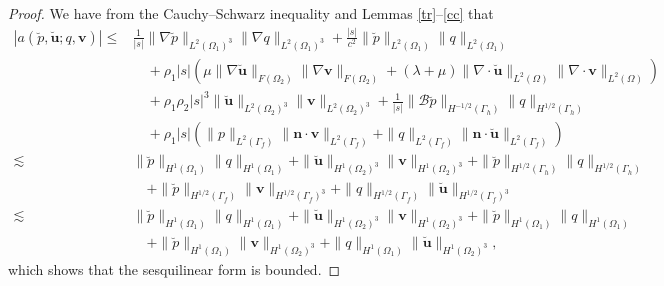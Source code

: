 \documentclass[final,leqno]{siamltex}
\begin{document}
\begin{proof}
We have from the Cauchy--Schwarz inequality and Lemmas
\ref{tr}--\ref{cc} that
\begin{align*}
 |a\left( \breve p, \breve {\boldsymbol u}; q, \boldsymbol v \right)|
 \leq&\frac{1}{|s|} \|\nabla \breve p\|_{L^2 (\Omega_1)^3} \|\nabla
{q}\|_{L^2(\Omega_1)^3} + \frac{|s|}{c^2} \|\breve p\|_{L^2 (\Omega_1)} \|  q
\|_{L^2 (\Omega_1)}\\
 &\quad +  \rho_1 |s| \left( \mu \| \nabla \breve {\boldsymbol u}\|_{F
(\Omega_2)} \|\nabla {\boldsymbol v}\|_{F (\Omega_2)}
 + (\lambda+ \mu) \| \nabla \cdot \breve {\boldsymbol u}\|_{L^2 (\Omega)} \|
\nabla \cdot {\boldsymbol v}\|_{L^2 (\Omega)}\right) \\
 &\quad + \rho_1 \rho_2 |s|^3 \| \breve {\boldsymbol u}\|_{L^2 (\Omega_2)^3}
\|\boldsymbol v\|_{L^2 (\Omega_2)^3}
 + \frac{1}{|s|} \|\mathscr{B} \breve p\|_{H^{-1/2} (\Gamma_h)} \|q\|_{H^{1/2}
(\Gamma_h)}\\
 &\quad + \rho_1 |s| \left(\|p\|_{L^2 (\Gamma_f) }
\|\boldsymbol n\cdot\boldsymbol v\|_{L^2 (\Gamma_f)}
 +\| q\|_{L^2 (\Gamma_f)} \| \boldsymbol n \cdot \breve {\boldsymbol
u}\|_{L^2 (\Gamma_f)}  \right)\\
 \lesssim & \| \breve p\|_{H^1 (\Omega_1)} \|q\|_{H^1 (\Omega_1)} +\| \breve
{\boldsymbol u}\|_{H^1 (\Omega_2)^3}
 \| \boldsymbol v\|_{H^1 (\Omega_2)^3} +\|\breve
p\|_{H^{1/2}(\Gamma_h)}\|q\|_{H^{1/2}(\Gamma_h)}\\
 &\quad + \|\breve p \|_{H^{1/2} (\Gamma_f)}
 \| \boldsymbol v\|_{H^{1/2} (\Gamma_f)^3}+\|q\|_{H^{1/2}(\Gamma_f)}\|\breve
{\boldsymbol u}\|_{H^{1/2}(\Gamma_f)^3}\\
 \lesssim & \| \breve p\|_{H^1 (\Omega_1)} \|q\|_{H^1 (\Omega_1)} +\| \breve
{\boldsymbol u}\|_{H^1 (\Omega_2)^3}
 \| \boldsymbol v\|_{H^1 (\Omega_2)^3} +\|\breve
p\|_{H^1(\Omega_1)}\|q\|_{H^1(\Omega_1)}\\
 &\quad +\|\breve p\|_{H^1(\Omega_1)}
 \|\boldsymbol v\|_{H^1(\Omega_2)^3} +\|q\|_{H^1 (\Omega_1)}
\|\breve {\boldsymbol u}\|_{H^1(\Omega_2)^3},
\end{align*}
which shows that the sesquilinear form is bounded.


\end{proof}
\end{document}
